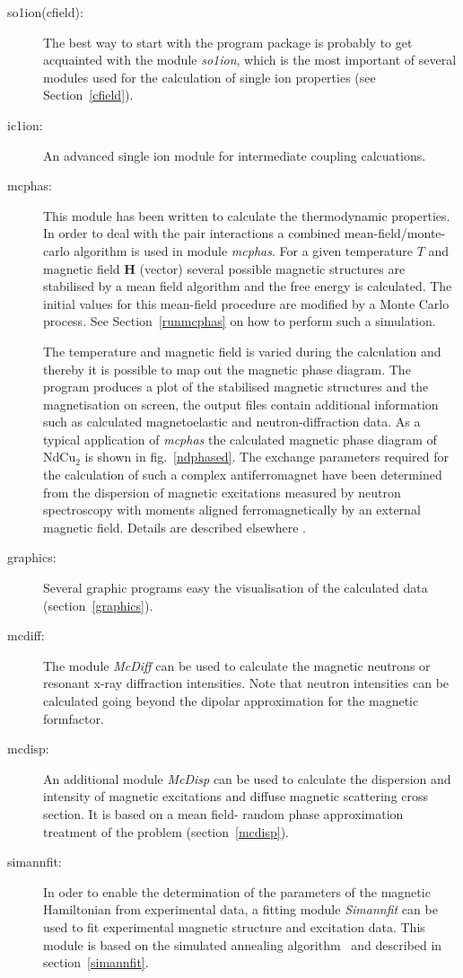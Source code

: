\documentclass[twoside]{article}
\newcommand{\mbf}[1]{\mathbf #1}
\newcommand{\prg}{\sl}
\begin{document}
\begin{description}
\item[so1ion(cfield):]
The best way to start with the program package is probably to get
acquainted with
the module {\prg so1ion}, which is the most important of several 
modules used for the calculation of single ion properties (see Section~\ref{cfield}).
\item[ic1ion:]
An advanced single ion module for intermediate coupling calcuations.
\item[mcphas:]
This module has been written to calculate the thermodynamic properties.
In order to  deal with the pair interactions a
 combined mean-field/monte-carlo algorithm is used in module {\prg mcphas}.
For a given temperature $T$ and magnetic field $\mbf H$ (vector)
 several possible magnetic structures are stabilised
by a mean field algorithm and the free energy is 
calculated. The initial values for this mean-field procedure are
modified by a Monte Carlo process.
See Section~\ref{runmcphas} on how to perform such a simulation.


The temperature and magnetic field is varied during the calculation
and thereby it is possible to map out the magnetic phase diagram.
The program produces a plot of the stabilised magnetic
structures and the magnetisation on screen, the
output files contain additional information 
such as calculated magnetoelastic and  neutron-diffraction
data. As a typical application of {\prg mcphas} the calculated magnetic
phase diagram of NdCu$_2$ is shown in fig.~\ref{ndphased}.
The exchange parameters required for the calculation of such a complex
antiferromagnet have
been determined from the dispersion of magnetic excitations
measured by neutron spectroscopy with moments aligned ferromagnetically
by an external magnetic field. Details are described elsewhere \cite{rotter00-29}.

\item[graphics:]
Several graphic programs easy the visualisation of the
calculated data (section~\ref{graphics}).

\item[mcdiff:]
The module {\prg McDiff} can be used to calculate the magnetic neutrons
or resonant x-ray diffraction intensities. Note that neutron intensities
can be calculated going beyond the dipolar approximation for the magnetic
formfactor.

\item[mcdisp:]
An additional module {\prg McDisp} can be used to calculate the 
dispersion and intensity
 of magnetic excitations and diffuse magnetic scattering cross section.
  It is based on a mean field- random
phase approximation treatment of the problem (section~\ref{mcdisp}). 
\item[simannfit:]
In oder to enable the determination of the parameters of the
magnetic Hamiltonian from experimental data, a fitting module
{\prg Simannfit} can be used to fit experimental  magnetic structure and excitation
data. This module is based on the simulated annealing 
algorithm~\cite{kirkpatrick83-671} and described in section~\ref{simannfit}.
\end{description}
\end{document}
